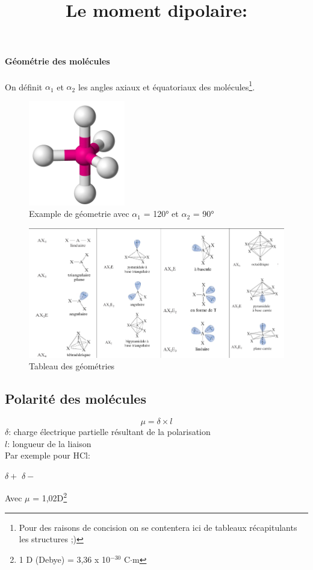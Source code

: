 \documentclass[10pt,a4paper]{book}
\begin{document}
\paragraph{Géométrie des molécules} On définit $\alpha_1$ et $\alpha_2$ les angles axiaux et équatoriaux des molécules\footnote{Pour des raisons de concision on se contentera ici de tableaux récapitulants les structures ;)}.
\begin{figure}[h!]
\begin{center}
\includegraphics[scale=0.75]{./assets/geometry_example.png}
\caption{Example de géometrie avec $\alpha_1$ = 120° et $\alpha_2$ = 90°}
\label{fig:geometry_ex}
\end{center}
\end{figure}
\begin{figure}[h!]
\begin{center}
\includegraphics[scale=0.65]{./assets/geometry_table.png}
\caption{Tableau des géométries}
\label{fig:geometry_table}
\end{center}
\end{figure}
\subsection{Polarité des molécules}
\title{Le moment dipolaire:}
\begin{displaymath}
\mu = \delta \times l
\end{displaymath}
$\delta$: charge électrique partielle résultant de la polarisation \\
$l$: longueur de la liaison\\
Par exemple pour HCl:\\
\begin{center}
$\delta+$ \; \; $\delta-$ \\
\end{center}
Avec $\mu$ = 1,02D\footnote{1 D (Debye) = 3,36 x 10$^{-30}$ C$\cdot$m}
\end{document}
